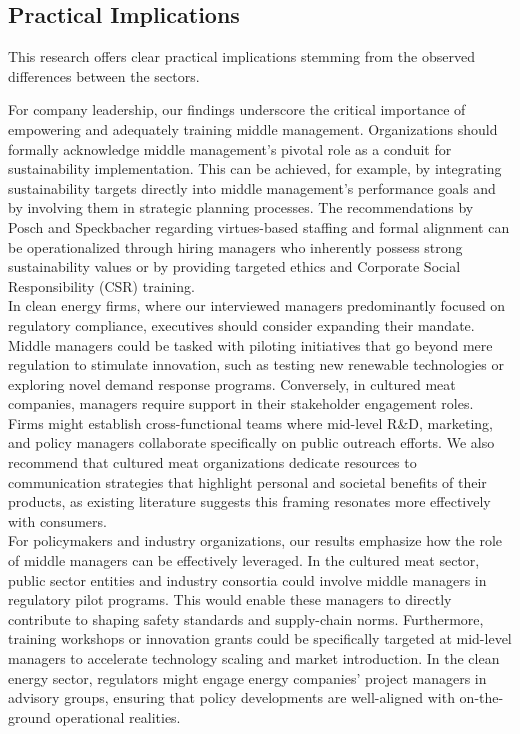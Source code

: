	\subsection{Practical Implications}
	This research offers clear practical implications stemming from the observed differences between the sectors.
	
	For company leadership, our findings underscore the critical importance of empowering and adequately training middle management. Organizations should formally acknowledge middle management's pivotal role as a conduit for sustainability implementation. This can be achieved, for example, by integrating sustainability targets directly into middle management's performance goals and by involving them in strategic planning processes. The recommendations by Posch and Speckbacher regarding virtues-based staffing and formal alignment can be operationalized through hiring managers who inherently possess strong sustainability values or by providing targeted ethics and Corporate Social Responsibility (CSR) training. \\
	
	In clean energy firms, where our interviewed managers predominantly focused on regulatory compliance, executives should consider expanding their mandate. Middle managers could be tasked with piloting initiatives that go beyond mere regulation to stimulate innovation, such as testing new renewable technologies or exploring novel demand response programs. Conversely, in cultured meat companies, managers require support in their stakeholder engagement roles. Firms might establish cross-functional teams where mid-level R\&D, marketing, and policy managers collaborate specifically on public outreach efforts. We also recommend that cultured meat organizations dedicate resources to communication strategies that highlight personal and societal benefits of their products, as existing literature suggests this framing resonates more effectively with consumers. \\
	
	For policymakers and industry organizations, our results emphasize how the role of middle managers can be effectively leveraged. In the cultured meat sector, public sector entities and industry consortia could involve middle managers in regulatory pilot programs. This would enable these managers to directly contribute to shaping safety standards and supply-chain norms. Furthermore, training workshops or innovation grants could be specifically targeted at mid-level managers to accelerate technology scaling and market introduction. In the clean energy sector, regulators might engage energy companies' project managers in advisory groups, ensuring that policy developments are well-aligned with on-the-ground operational realities. \\
	
